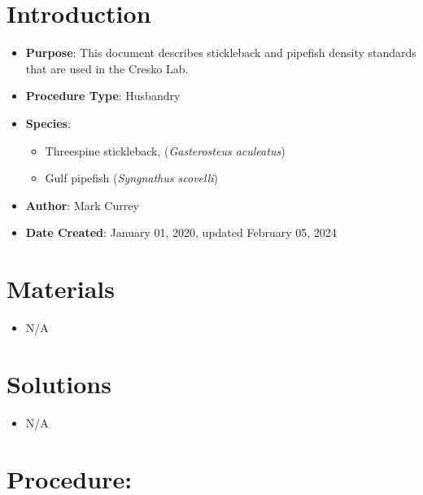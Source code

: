 \documentclass[
  letterpaper,
  DIV=11,
  numbers=noendperiod]{scrreprt}
\providecommand{\tightlist}{%
  \setlength{\itemsep}{0pt}\setlength{\parskip}{0pt}}\usepackage{longtable,booktabs,array}
\begin{document}
\hypertarget{introduction-26}{%
\section{Introduction}\label{introduction-26}}

\begin{itemize}
\tightlist
\item
  \textbf{Purpose}: This document describes stickleback and pipefish
  density standards that are used in the Cresko Lab.
\item
  \textbf{Procedure Type}: Husbandry
\item
  \textbf{Species}:

  \begin{itemize}
  \tightlist
  \item
    Threespine stickleback, (\emph{Gasterosteus aculeatus})
  \item
    Gulf pipefish (\emph{Syngnathus scovelli})
  \end{itemize}
\item
  \textbf{Author}: Mark Currey\\
\item
  \textbf{Date Created}: January 01, 2020, updated February 05, 2024
\end{itemize}

\hypertarget{materials-24}{%
\section{Materials}\label{materials-24}}

\begin{itemize}
\tightlist
\item
  N/A
\end{itemize}

\hypertarget{solutions-20}{%
\section{Solutions}\label{solutions-20}}

\begin{itemize}
\tightlist
\item
  N/A
\end{itemize}

\hypertarget{procedure-26}{%
\section{Procedure:}\label{procedure-26}}
\end{document}
